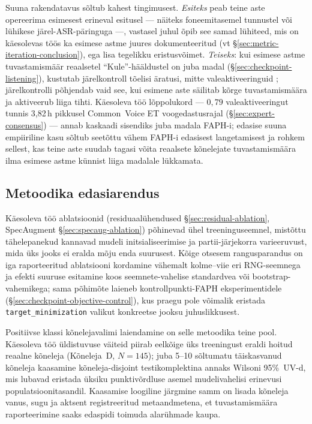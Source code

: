 Suuna rakendatavus sõltub kahest tingimusest. \emph{Esiteks} peab teine aste opereerima esimesest erineval esitusel --- näiteks foneemitasemel tunnustel või lühikese järel-ASR-päringuga \cite{wang2020lfmmi,rikhye2021personalized} ---, vastasel juhul õpib see samad lühiteed, mis on käesolevas töös ka esimese astme juures dokumenteeritud (vt §\ref{sec:metric-iteration-conclusion}), ega lisa tegelikku eristusvõimet. \emph{Teiseks}: kui esimese astme tuvastamismäär reaalsetel \enquote{Kule}-hääldustel on juba madal (§\ref{sec:checkpoint-listening}), kustutab järelkontroll tõelisi äratusi, mitte valeaktiveeringuid \cite{kumar2020wakeword}; järelkontrolli põhjendab vaid see, kui esimene aste säilitab kõrge tuvastamismäära ja aktiveerub liiga tihti. Käesoleva töö lõppolukord --- $0{,}79$ valeaktiveeringut tunnis 3,82\,h pikkusel Common~Voice ET voogedastusrajal (§\ref{sec:expert-consensus}) --- annab kaskaadi sisendiks juba madala FAPH-i; edasise suuna empiiriline kasu sõltub seetõttu vähem FAPH-i edasisest langetamisest ja rohkem sellest, kas teine aste suudab tagasi võita reaalsete kõnelejate tuvastamismäära ilma esimese astme künnist liiga madalale lükkamata.

\subsection{Metoodika edasiarendus}
\label{sec:future-methodology}

Käesoleva töö ablatsioonid (residuaalühendused §\ref{sec:residual-ablation}, SpecAugment §\ref{sec:specaug-ablation}) põhinevad ühel treeninguseemnel, mistõttu tähelepanekud kannavad mudeli initsialiseerimise ja partii-järjekorra varieeruvust, mida üks jooks ei eralda mõju enda suurusest. Kõige otsesem rangusparandus on iga raporteeritud ablatsiooni kordamine vähemalt kolme--viie eri RNG-seemnega ja efekti suuruse esitamine koos seemnete-vahelise standardvea või bootstrap-vahemikega; sama põhimõte laieneb kontrollpunkti-FAPH eksperimentidele (§\ref{sec:checkpoint-objective-control}), kus praegu pole võimalik eristada \texttt{target\_minimization} valikut konkreetse jooksu juhuslikkusest.

Positiivse klassi kõnelejavalimi laiendamine on selle metoodika teine pool. Käesoleva töö üldistuvuse väiteid piirab eelkõige üks treeningust eraldi hoitud reaalne kõneleja (Kõneleja~D, $N=145$); juba 5--10 sõltumatu täiskasvanud kõneleja kaasamine kõneleja-disjoint testikomplektina annaks Wilsoni 95\%~UV-d, mis lubavad eristada üksiku punktivõrdluse asemel mudelivahelisi erinevusi populatsioonitasandil. Kaasamise loogiline järgmine samm on lisada kõneleja vanus, sugu ja aktsent registreeritud metaandmetena, et tuvastamismäära raporteerimine saaks edaspidi toimuda alarühmade kaupa.

